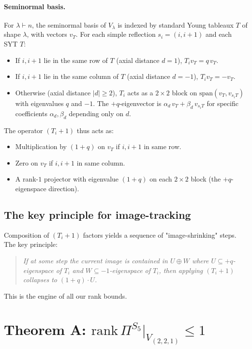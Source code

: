 \documentclass[11pt]{article}
\theoremstyle{definition}
\begin{document}
\paragraph{Seminormal basis.}
For $\lambda \vdash n$, the seminormal basis of $V_\lambda$ is indexed
by standard Young tableaux $T$ of shape $\lambda$, with vectors $v_T$.
For each simple reflection $s_i = (i, i+1)$ and each SYT $T$:
\begin{itemize}[topsep=0.3em,itemsep=0.2em,leftmargin=2em]
\item If $i, i+1$ lie in the same row of $T$ (axial distance $d=1$),
$T_i v_T = q\, v_T$.
\item If $i, i+1$ lie in the same column of $T$ (axial distance $d=-1$),
$T_i v_T = -v_T$.
\item Otherwise (axial distance $|d| \geq 2$), $T_i$ acts as a
$2\times 2$ block on $\mathrm{span}(v_T, v_{s_i T})$ with
eigenvalues $q$ and $-1$. The $+q$-eigenvector is
$\alpha_d\, v_T + \beta_d\, v_{s_i T}$ for specific
coefficients $\alpha_d, \beta_d$ depending only on $d$.
\end{itemize}

The operator $(T_i+1)$ thus acts as:
\begin{itemize}[topsep=0.3em,itemsep=0.2em,leftmargin=2em]
\item Multiplication by $(1+q)$ on $v_T$ if $i, i+1$ in same row.
\item Zero on $v_T$ if $i, i+1$ in same column.
\item A rank-$1$ projector with eigenvalue $(1+q)$ on each $2\times 2$
block (the $+q$-eigenspace direction).
\end{itemize}

\subsection{The key principle for image-tracking}\label{sec:principle}

Composition of $(T_i+1)$ factors yields a sequence of "image-shrinking"
steps. The key principle:
\begin{quote}\itshape
If at some step the current image is contained in
$U \oplus W$ where $U \subseteq +q$-eigenspace of $T_i$ and
$W \subseteq -1$-eigenspace of $T_i$, then applying $(T_i+1)$
collapses to $(1+q)\cdot U$.
\end{quote}
This is the engine of all our rank bounds.

\section{Theorem A: $\mathrm{rank}\,\Pi^{S_5}|_{V_{(2,2,1)}} \leq 1$}
\label{sec:221-rank1}
\end{document}
